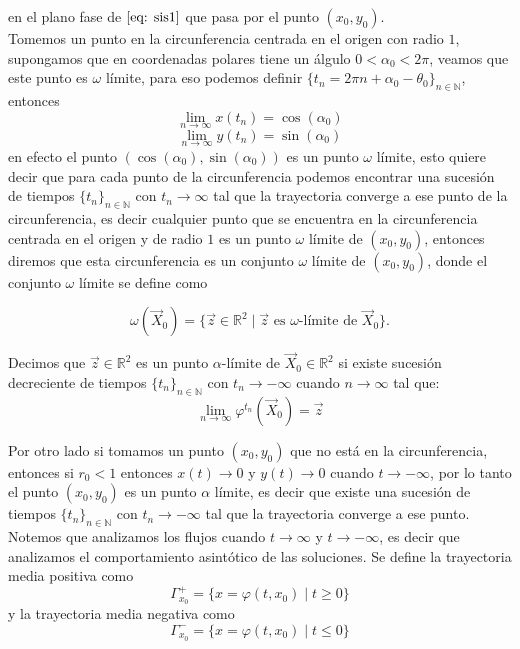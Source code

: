 en el plano fase de $\eqref{eq: sis1}$ que pasa por el punto
$(x_0,y_0)$.\\

Tomemos un punto en la circunferencia centrada en el origen con radio $1$,
supongamos que
en coordenadas polares tiene un álgulo $0<\alpha_0<2\pi$, veamos que este punto es $\omega$ límite, para eso podemos definir
$\{t_n=2\pi n+\alpha_0-\theta_0\}_{n\in \mathbb{N}}$, entonces
$$\lim_{n\to\infty}x(t_n)=\cos(\alpha_0)$$
$$\lim_{n\to\infty}y(t_n)=\sin(\alpha_0)$$
en efecto el punto $(\cos(\alpha_0),\sin(\alpha_0))$ es un punto $\omega$ límite, esto
quiere decir que para cada punto de la circunferencia podemos encontrar
una sucesión de tiempos $\{t_n\}_{n\in \mathbb{N}}$ con $t_n\to\infty$ tal que la
trayectoria converge a ese punto de la circunferencia, es decir cualquier punto que se encuentra en la
circunferencia centrada en el origen y de radio $1$ es un punto $\omega$ límite de $(x_0,y_0)$,
entonces diremos que esta circunferencia es un conjunto $\omega$ límite de $(x_0,y_0)$, donde
el conjunto $\omega$ límite se define como

$$\omega(\vec{X}_0)=\{\vec{z}\in\mathbb{R}^2\mid\vec{z} \text{  es  } \omega\text{-límite de  } \vec{X}_0\}.$$

\begin{definition}
	Decimos que $\vec{z}\in\mathbb{R}^2$ es un punto $\alpha$-límite
	de $\vec{X}_0\in\mathbb{R}^2$ si existe sucesión decreciente de
	tiempos $\{t_n\}_{n\in\mathbb{N}}$
	con $t_n \to-\infty$ cuando $n\to \infty$ tal que:
	$$\lim_{n\to\infty}\varphi^{t_n}(\vec{X}_0)=\vec{z}$$
\end{definition}

Por otro lado si tomamos un punto $(x_0,y_0)$ que no está en la circunferencia, entonces si  $r_0<1$ entonces $x(t)\to 0$ y $y(t)\to 0$ cuando $t\to-\infty$, por lo tanto el punto $(x_0,y_0)$ es un punto $\alpha$ límite, es decir que existe una sucesión de tiempos $\{t_n\}_{n\in \mathbb{N}}$ con $t_n\to-\infty$ tal que la trayectoria converge a ese punto.\\

Notemos que analizamos los flujos cuando $t\to\infty$ y $t\to-\infty$, es decir que analizamos el comportamiento asintótico de las soluciones. Se define la trayectoria media positiva como
$$\varGamma_{x_0}^{+}=\{x=\varphi(t,x_0)\mid t\geq0\}$$
y la trayectoria media negativa como
$$\varGamma_{x_0}^{-}=\{x=\varphi(t,x_0)\mid t\leq0\}$$

